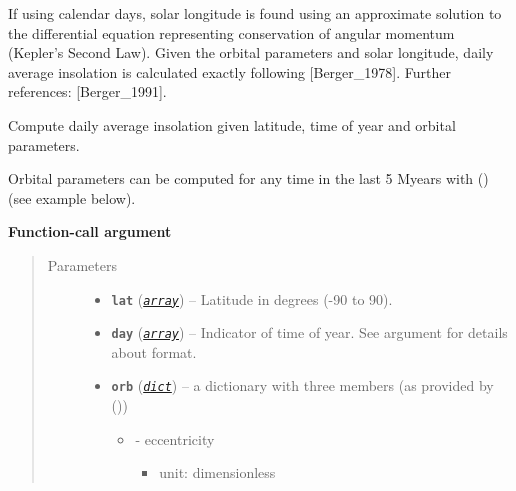 \documentclass[a4paper,10pt,english]{sphinxmanual}
\begin{document}
If using calendar days, solar longitude is found using an
approximate solution to the differential equation representing conservation
of angular momentum (Kepler's Second Law).  Given the orbital parameters
and solar longitude, daily average insolation is calculated exactly
following {[}Berger\_1978{]}. Further references: {[}Berger\_1991{]}.

\begin{fulllineitems}
\label{api/climlab.solar:climlab.solar.insolation.daily_insolation}
Compute daily average insolation given latitude, time of year and orbital parameters.

Orbital parameters can be computed for any time in the last 5 Myears with
{\hyperref[api/climlab.solar:climlab.solar.orbital.OrbitalTable.lookup_parameters]{\emph{}}} () (see example below).

\textbf{Function-call argument}
\begin{quote}\begin{description}
\item[{Parameters}] \leavevmode\begin{itemize}
\item {} 
\textbf{\texttt{lat}} (\href{http://docs.python.org/2.7/library/array.html\#module-array}{\emph{\texttt{array}}}) -- Latitude in degrees (-90 to 90).

\item {} 
\textbf{\texttt{day}} (\href{http://docs.python.org/2.7/library/array.html\#module-array}{\emph{\texttt{array}}}) -- Indicator of time of year. See argument 
for details about format.

\item {} 
\textbf{\texttt{orb}} (\href{http://docs.python.org/2.7/library/stdtypes.html\#dict}{\emph{\texttt{dict}}}) -- 
a dictionary with three members (as provided by 
{\hyperref[api/climlab.solar:climlab.solar.orbital.OrbitalTable]{\emph{}}} ())
\begin{itemize}
\item {} 
 - eccentricity
\begin{itemize}
\item {} 
unit: dimensionless


\end{itemize}
\end{itemize}
\end{itemize}
\end{description}
\end{quote}
\end{fulllineitems}
\end{document}
